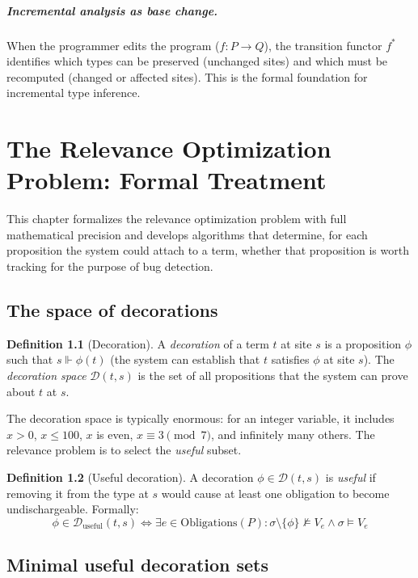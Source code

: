 \documentclass[11pt]{report}
\theoremstyle{definition}
\newtheorem{definition}{Definition}[section]
\theoremstyle{plain}
\begin{document}
\paragraph{Incremental analysis as base change.}
When the programmer edits the program ($f : P \to Q$), the transition functor
$f^*$ identifies which types can be preserved (unchanged sites) and which
must be recomputed (changed or affected sites). This is the formal
foundation for incremental type inference.


\chapter{The Relevance Optimization Problem: Formal Treatment}

This chapter formalizes the relevance optimization problem with full
mathematical precision and develops algorithms that determine, for each
proposition the system could attach to a term, whether that proposition is
worth tracking for the purpose of bug detection.

\section{The space of decorations}

\begin{definition}[Decoration]
A \emph{decoration} of a term $t$ at site $s$ is a proposition $\phi$ such
that $s \Vdash \phi(t)$ (the system can establish that $t$ satisfies $\phi$
at site $s$). The \emph{decoration space} $\mathcal{D}(t, s)$ is the set of
all propositions that the system can prove about $t$ at $s$.
\end{definition}

The decoration space is typically enormous: for an integer variable, it
includes $x > 0$, $x \leq 100$, $x$ is even, $x \equiv 3 \pmod{7}$, and
infinitely many others. The relevance problem is to select the
\emph{useful} subset.

\begin{definition}[Useful decoration]
A decoration $\phi \in \mathcal{D}(t, s)$ is \emph{useful} if removing it
from the type at $s$ would cause at least one obligation to become
undischargeable. Formally:
\[
  \phi \in \mathcal{D}_{\mathrm{useful}}(t, s) \iff
  \exists e \in \mathrm{Obligations}(P) :
  \sigma \setminus \{\phi\} \not\models V_e \wedge
  \sigma \models V_e
\]
\end{definition}

\section{Minimal useful decoration sets}
\end{document}
